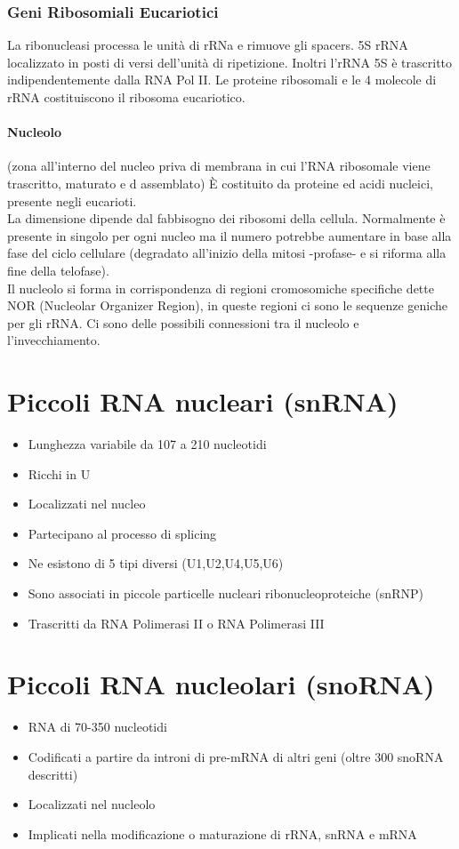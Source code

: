 \documentclass{article}
\begin{document}
\subsubsection{Geni Ribosomiali Eucariotici}
La ribonucleasi processa le unità di rRNa e rimuove gli spacers. 5S rRNA localizzato in posti di versi dell'unità di ripetizione.
Inoltri l'rRNA 5S è trascritto indipendentemente dalla RNA Pol II. Le proteine ribosomali e le 4 molecole di rRNA costituiscono il ribosoma eucariotico.
\paragraph{Nucleolo} (zona all'interno del nucleo priva di membrana in cui l'RNA ribosomale
viene trascritto, maturato e d assemblato) È costituito da proteine ed acidi nucleici, presente negli eucarioti.\\
La dimensione dipende dal fabbisogno dei ribosomi della cellula. Normalmente è presente in singolo per ogni nucleo ma il numero potrebbe
aumentare in base alla fase del ciclo cellulare (degradato all'inizio della mitosi
-profase- e si riforma alla fine della telofase).\\
Il nucleolo si forma in corrispondenza di regioni cromosomiche specifiche dette
NOR (Nucleolar Organizer Region), in queste regioni ci sono le sequenze
geniche per gli rRNA.
Ci sono delle possibili connessioni tra il nucleolo e l'invecchiamento.
\section{Piccoli RNA nucleari (snRNA)}
\begin{itemize}
    \item Lunghezza variabile da 107 a 210 nucleotidi 
    \item Ricchi in U
    \item Localizzati nel nucleo
    \item Partecipano al processo di splicing
    \item Ne esistono di 5 tipi diversi (U1,U2,U4,U5,U6)
    \item Sono associati in piccole particelle nucleari ribonucleoproteiche (snRNP)
    \item Trascritti da RNA Polimerasi II o RNA Polimerasi III
\end{itemize}
\section{Piccoli RNA nucleolari (snoRNA)}
\begin{itemize}
    \item RNA di 70-350 nucleotidi
    \item Codificati a partire da introni di pre-mRNA di altri geni (oltre 300 snoRNA descritti)
    \item Localizzati nel nucleolo
    \item Implicati nella modificazione o maturazione di rRNA, snRNA e mRNA
\end{itemize}
\end{document}
